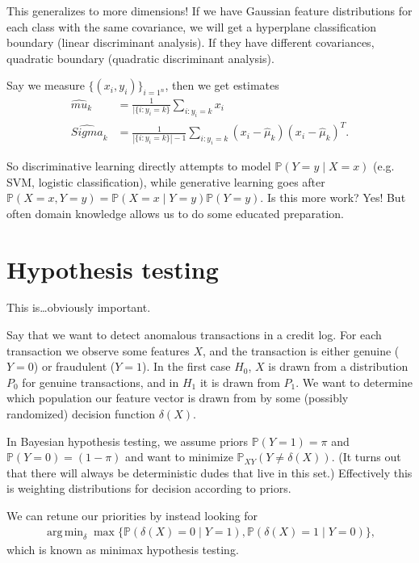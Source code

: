 \documentclass[11pt,letterpaper]{article}
\DeclareMathOperator*{\argmin}{arg\,min}
\theoremstyle{definition}
\numberwithin{equation}{section}
\numberwithin{figure}{section}
\begin{document}
This generalizes to more dimensions! If we have Gaussian feature distributions for each class with the same covariance, we will get a hyperplane classification boundary (linear discriminant analysis). If they have different covariances, quadratic boundary (quadratic discriminant analysis).

Say we measure $\{(x_i,y_i)\}_{i=1^n}$, then we get estimates
%
\begin{align}
	\hat{mu}_k &= \frac{1}{|\{i : y_i = k\}} \sum_{i:y_i=k} x_i\\
	\hat{Sigma}_k &= \frac{1}{|\{i:y_i = k\}|-1} \sum_{i:y_i = k} (x_i - \hat{\mu}_k)(x_i - \hat{\mu}_k)^T.
\end{align}

So discriminative learning directly attempts to model $\mathbb{P}(Y=y \mid X=x)$ (e.g. SVM, logistic classification), while generative learning goes after $\mathbb{P}(X=x,Y=y) = \mathbb{P}(X=x\mid Y=y) \mathbb{P}(Y=y)$. Is this more work? Yes! But often domain knowledge allows us to do some educated preparation.













\section{Hypothesis testing}
This is\ldots obviously important.

Say that we want to detect anomalous transactions in a credit log. For each transaction we observe some features $X$, and the transaction is either genuine ($Y=0$) or fraudulent ($Y=1$). In the first case $H_0$, $X$ is drawn from a distribution $P_0$ for genuine transactions, and in $H_1$ it is drawn from $P_1$. We want to determine which population our feature vector is drawn from by some (possibly randomized) decision function $\delta(X)$.

In Bayesian hypothesis testing, we assume priors $\mathbb{P}(Y=1) = \pi$ and $\mathbb{P}(Y=0) = (1-\pi)$ and want to minimize $\mathbb{P}_{XY}(Y \neq \delta(X))$. (It turns out that there will always be deterministic dudes that live in this set.) Effectively this is weighting distributions for decision according to priors.


We can retune our priorities by instead looking for
%
\begin{align}
	\argmin_\delta \max\{\mathbb{P}(\delta(X) = 0\mid Y=1), \mathbb{P}(\delta(X) =1 \mid Y=0)\},
\end{align}
%
which is known as minimax hypothesis testing.
\end{document}
